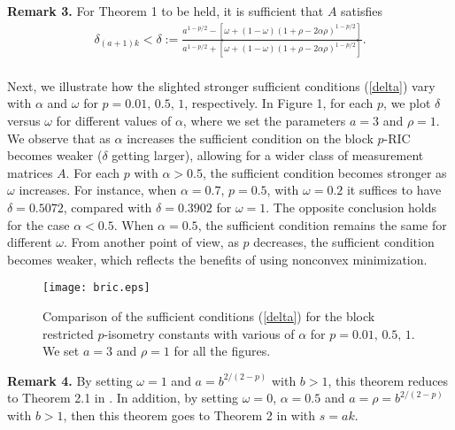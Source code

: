 \documentclass[11pt]{article}
\begin{document}
\noindent
{\bf Remark 3.} For Theorem 1 to be held, it is sufficient that $A$ satisfies \begin{align}
\delta_{(a+1)k}<\delta:=\frac{a^{1-p/2}-[\omega+(1-\omega)(1+\rho-2\alpha\rho)^{1-p/2}]}{a^{1-p/2}+[\omega+(1-\omega)(1+\rho-2\alpha\rho)^{1-p/2}]}. \label{delta}
\end{align}\\

Next, we illustrate how the slighted stronger sufficient conditions (\ref{delta}) vary with $\alpha$ and $\omega$ for $p=0.01,\,0.5,\,1$, respectively. In Figure 1, for each $p$, we plot $\delta$ versus $\omega$ for different values of $\alpha$, where we set the parameters $a=3$ and $\rho=1$. We observe that as $\alpha$ increases the sufficient condition on the block $p$-RIC becomes weaker ($\delta$ getting larger), allowing for a wider class of measurement matrices $A$. For each $p$ with $\alpha>0.5$, the sufficient condition becomes stronger as $\omega$ increases. For instance, when $\alpha=0.7$, $p=0.5$, with $\omega=0.2$ it suffices to have $\delta=0.5072$, compared with $\delta=0.3902$ for $\omega=1$. The opposite conclusion holds for the case $\alpha<0.5$. When $\alpha=0.5$, the sufficient condition remains the same for different $\omega$. From another point of view, as $p$ decreases, the sufficient condition becomes weaker, which reflects the benefits of using nonconvex minimization.  \\

\begin{figure}[htbp]
	\centering
	\texttt{[image: bric.eps]}
	\caption{Comparison of the sufficient conditions (\ref{delta}) for the block restricted $p$-isometry constants with various of $\alpha$ for $p=0.01,\,0.5,\,1$. We set $a=3$ and $\rho=1$ for all the figures.}\label{fig:1}
\end{figure}

\noindent
{\bf Remark 4.} By setting $\omega=1$ and $a=b^{2/(2-p)}$ with $b>1$, this theorem reduces to Theorem 2.1 in \cite{wwx2}. In addition, by setting  $\omega=0$, $\alpha=0.5$ and $a=\rho=b^{2/(2-p)}$ with $b>1$, then this theorem goes to Theorem 2 in \cite{hwwx} with $s=ak$.\\
\end{document}
